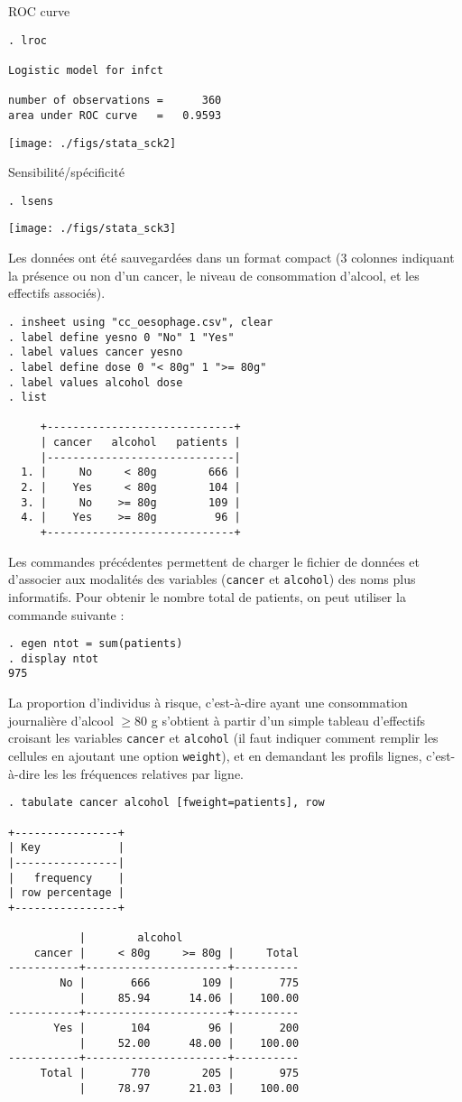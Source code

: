 
ROC curve
\begin{verbatim}
. lroc

Logistic model for infct

number of observations =      360
area under ROC curve   =   0.9593
\end{verbatim}

\texttt{[image: ./figs/stata\_sck2]}

Sensibilité/spécificité
\begin{verbatim}
. lsens
\end{verbatim}

\texttt{[image: ./figs/stata\_sck3]}

% 
%
%
\soln{\ref{exo:10.6}}
Les données ont été sauvegardées dans un format compact (3 colonnes
indiquant la présence ou non d'un cancer, le niveau de consommation
d'alcool, et les effectifs associés).
\begin{verbatim}
. insheet using "cc_oesophage.csv", clear
. label define yesno 0 "No" 1 "Yes" 
. label values cancer yesno 
. label define dose 0 "< 80g" 1 ">= 80g"
. label values alcohol dose
. list

     +-----------------------------+
     | cancer   alcohol   patients |
     |-----------------------------|
  1. |     No     < 80g        666 |
  2. |    Yes     < 80g        104 |
  3. |     No    >= 80g        109 |
  4. |    Yes    >= 80g         96 |
     +-----------------------------+
\end{verbatim}
Les commandes précédentes permettent de charger le fichier de données et
d'associer aux modalités des variables (\texttt{cancer} et \texttt{alcohol})
des noms plus informatifs. Pour obtenir le nombre total de patients, on peut
utiliser la commande suivante :
\begin{verbatim}
. egen ntot = sum(patients)
. display ntot
975
\end{verbatim}

La proportion d'individus à risque, c'est-à-dire ayant une consommation
journalière d'alcool $\ge 80$ g s'obtient à partir d'un simple tableau
d'effectifs croisant les variables \texttt{cancer} et \texttt{alcohol} (il
faut indiquer comment remplir les cellules en ajoutant une option
\texttt{weight}), et en demandant les profils lignes, c'est-à-dire les les
fréquences relatives par ligne.
\begin{verbatim}
. tabulate cancer alcohol [fweight=patients], row

+----------------+
| Key            |
|----------------|
|   frequency    |
| row percentage |
+----------------+

           |        alcohol
    cancer |     < 80g     >= 80g |     Total
-----------+----------------------+----------
        No |       666        109 |       775 
           |     85.94      14.06 |    100.00 
-----------+----------------------+----------
       Yes |       104         96 |       200 
           |     52.00      48.00 |    100.00 
-----------+----------------------+----------
     Total |       770        205 |       975 
           |     78.97      21.03 |    100.00
\end{verbatim}

